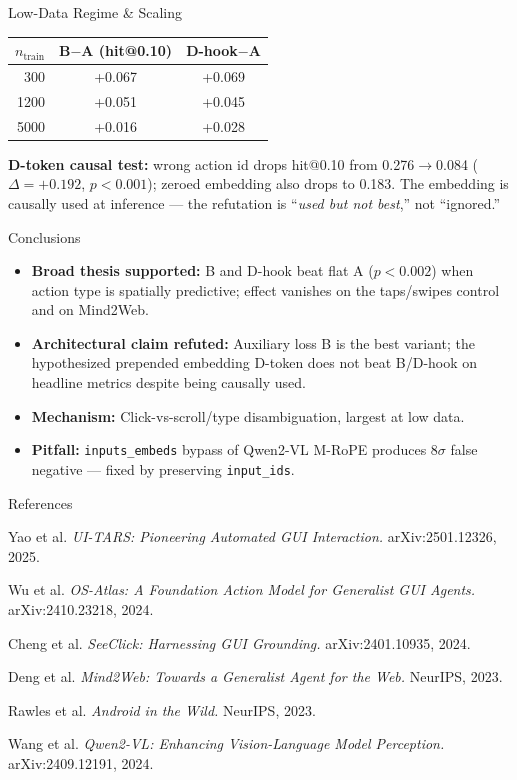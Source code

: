 \documentclass[final]{beamer}
\newlength{\colwidth}
\begin{document}
\begin{frame}[t]
\begin{columns}[t]
\begin{column}{\colwidth}
\begin{block}{Low-Data Regime \& Scaling}
    \begin{tabular}{@{}rcc@{}}
      \toprule
      $n_\text{train}$ & B$-$A (hit@0.10) & D-hook$-$A \\
      \midrule
      300  & +0.067 & +0.069 \\
      1200 & +0.051 & +0.045 \\
      5000 & +0.016 & +0.028 \\
      \bottomrule
    \end{tabular}

    \textbf{D-token causal test:} wrong action id drops hit@0.10 from 0.276$\to$0.084 ($\Delta{=}{+}0.192$, $p{<}0.001$); zeroed embedding also drops to 0.183. The embedding is causally used at inference --- the refutation is ``\emph{used but not best},'' not ``ignored.''
  \end{block}

  \begin{alertblock}{Conclusions}
    \begin{itemize}
      \item \textbf{Broad thesis supported:} B and D-hook beat flat A ($p{<}0.002$) when action type is spatially predictive; effect vanishes on the taps/swipes control and on Mind2Web.
      \item \textbf{Architectural claim refuted:} Auxiliary loss B is the best variant; the hypothesized prepended embedding D-token does not beat B/D-hook on headline metrics despite being causally used.
      \item \textbf{Mechanism:} Click-vs-scroll/type disambiguation, largest at low data.
      \item \textbf{Pitfall:} \texttt{inputs\_embeds} bypass of Qwen2-VL M-RoPE produces $8\sigma$ false negative --- fixed by preserving \texttt{input\_ids}.
    \end{itemize}
  \end{alertblock}

  \begin{block}{References}
    \scriptsize
    \begin{enumerate}[leftmargin=1.8em, label={[\arabic*]}, itemsep=0pt, topsep=0pt, parsep=0pt]
      \item Yao et al. \textit{UI-TARS: Pioneering Automated GUI Interaction.} arXiv:2501.12326, 2025.
      \item Wu et al. \textit{OS-Atlas: A Foundation Action Model for Generalist GUI Agents.} arXiv:2410.23218, 2024.
      \item Cheng et al. \textit{SeeClick: Harnessing GUI Grounding.} arXiv:2401.10935, 2024.
      \item Deng et al. \textit{Mind2Web: Towards a Generalist Agent for the Web.} NeurIPS, 2023.
      \item Rawles et al. \textit{Android in the Wild.} NeurIPS, 2023.
      \item Wang et al. \textit{Qwen2-VL: Enhancing Vision-Language Model Perception.} arXiv:2409.12191, 2024.
    \end{enumerate}
  \end{block}


\end{column}
\end{columns}
\end{frame}
\end{document}
